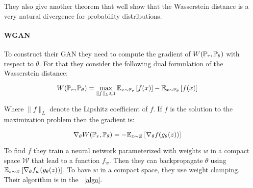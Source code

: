 
They also give another theorem that well show that the Wasserstein distance
is a very natural divergence for probability distributions.


\paragraph{WGAN}
To construct their GAN they need to compute the gradient of $W(\mathbb{P}_r,
\mathbb{P}_\theta)$ with respect to $\theta$. For that they consider the following
dual formulation of the Wasserstein distance:

$$ W(\mathbb{P}_r ,\mathbb{P}_\theta) = \max_{\| f \|_L \leqslant 1} \mathbb{E}_{x \sim \mathbb{P}_r} \left[ f(x) \right] - \mathbb{E}_{x \sim \mathbb{P}_\theta} \left[ f(x) \right] $$

Where $\| f \|_L$ denote the Lipshitz coefficient of $f$. If $f$ is the
solution to the maximization problem then the gradient is:

$$ \nabla_\theta W(\mathbb{P}_r, \mathbb{P}_\theta) = - \mathbb{E}_{z \sim Z} \left[ \nabla_\theta f(g_\theta(z)) \right] $$

To find $f$ they train a neural network parameterized with weights $w$
in a compact space $\mathcal{W}$ that lead to a function $f_w$. Then they
can backpropagate $\theta$ using $\mathbb{E}_{z \sim Z} \left[ \nabla_\theta f_w
(g_\theta(z)) \right]$.  To have $w$ in a compact space, they use weight
clamping. Their algorithm is in the \figurename~\ref{algo}.

